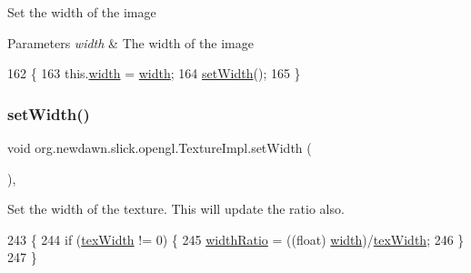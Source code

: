 Set the width of the image


\begin{DoxyParams}{Parameters}
{\em width} & The width of the image \\
\hline
\end{DoxyParams}

\begin{DoxyCode}
162                                     \{
163         this.\mbox{\hyperlink{classorg_1_1newdawn_1_1slick_1_1opengl_1_1_texture_impl_a73412d6372fabe2942ffa281f91a830c}{width}} = \mbox{\hyperlink{classorg_1_1newdawn_1_1slick_1_1opengl_1_1_texture_impl_a73412d6372fabe2942ffa281f91a830c}{width}};
164         \mbox{\hyperlink{classorg_1_1newdawn_1_1slick_1_1opengl_1_1_texture_impl_acac95e7726dd15b2fed3e6370f69f11e}{setWidth}}();
165     \}
\end{DoxyCode}
\mbox{\label{classorg_1_1newdawn_1_1slick_1_1opengl_1_1_texture_impl_acac95e7726dd15b2fed3e6370f69f11e}} 
\subsubsection{\texorpdfstring{set\+Width()}{setWidth()}\hspace{0.1cm}{\footnotesize\ttfamily [2/2]}}
{\footnotesize\ttfamily void org.\+newdawn.\+slick.\+opengl.\+Texture\+Impl.\+set\+Width (\begin{DoxyParamCaption}{ }\end{DoxyParamCaption})\hspace{0.3cm}{\ttfamily [inline]}, {\ttfamily [private]}}

Set the width of the texture. This will update the ratio also. 
\begin{DoxyCode}
243                             \{
244         \textcolor{keywordflow}{if} (\mbox{\hyperlink{classorg_1_1newdawn_1_1slick_1_1opengl_1_1_texture_impl_acb22083c60049df21f8e484413d73212}{texWidth}} != 0) \{
245             \mbox{\hyperlink{classorg_1_1newdawn_1_1slick_1_1opengl_1_1_texture_impl_a724dda9aa9dc49dee3f80d62cdd68fa9}{widthRatio}} = ((float) \mbox{\hyperlink{classorg_1_1newdawn_1_1slick_1_1opengl_1_1_texture_impl_a73412d6372fabe2942ffa281f91a830c}{width}})/\mbox{\hyperlink{classorg_1_1newdawn_1_1slick_1_1opengl_1_1_texture_impl_acb22083c60049df21f8e484413d73212}{texWidth}};
246         \}
247     \}
\end{DoxyCode}
\mbox{\label{classorg_1_1newdawn_1_1slick_1_1opengl_1_1_texture_impl_a824866b015116d341fb9fc0f9f0bb86f}} 
